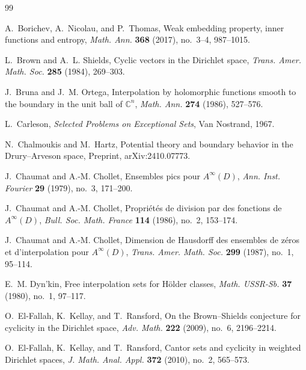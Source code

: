 \documentclass[a4paper,12pt]{amsart}
\theoremstyle{definition}
\theoremstyle{remark}
\begin{document}

\begin{thebibliography}{99}

A.~Borichev, A.~Nicolau, and P.~Thomas,
\newblock Weak embedding property, inner functions and entropy,
\newblock \emph{Math. Ann.} \textbf{368} (2017), no.~3--4, 987--1015.

L.~Brown and A.~L. Shields,
\newblock Cyclic vectors in the {Dirichlet} space,
\newblock \emph{Trans. Amer. Math. Soc.} \textbf{285} (1984), 269--303.

J.~Bruna and J.~M. Ortega,
\newblock Interpolation by holomorphic functions smooth to the boundary in the unit ball of $\mathbb{C}^n$,
\newblock \emph{Math. Ann.} \textbf{274} (1986), 527--576.

L.~Carleson,
\newblock \emph{Selected Problems on Exceptional Sets},
\newblock Van Nostrand, 1967.

N.~Chalmoukis and M.~Hartz,
\newblock Potential theory and boundary behavior in the {D}rury--{A}rveson space,
\newblock Preprint, arXiv:2410.07773.

J.~Chaumat and A.-M. Chollet,
\newblock Ensembles pics pour $A^\infty(D)$,
\newblock \emph{Ann. Inst. Fourier} \textbf{29} (1979), no.~3, 171--200.

J.~Chaumat and A.-M. Chollet,
\newblock Propriétés de division par des fonctions de $A^\infty(D)$,
\newblock \emph{Bull. Soc. Math. France} \textbf{114} (1986), no.~2, 153--174.

J.~Chaumat and A.-M. Chollet,
\newblock Dimension de {H}ausdorff des ensembles de zéros et d'interpolation pour $A^\infty(D)$,
\newblock \emph{Trans. Amer. Math. Soc.} \textbf{299} (1987), no.~1, 95--114.

E.~M. Dyn'kin,
\newblock Free interpolation sets for {H}ölder classes,
\newblock \emph{Math. USSR-Sb.} \textbf{37} (1980), no.~1, 97--117.

O.~El-Fallah, K.~Kellay, and T.~Ransford,
\newblock On the {Brown--Shields} conjecture for cyclicity in the {Dirichlet} space,
\newblock \emph{Adv. Math.} \textbf{222} (2009), no.~6, 2196--2214.

O.~El-Fallah, K.~Kellay, and T.~Ransford,
\newblock Cantor sets and cyclicity in weighted {Dirichlet} spaces,
\newblock \emph{J. Math. Anal. Appl.} \textbf{372} (2010), no.~2, 565--573.


\end{thebibliography}
\end{document}
